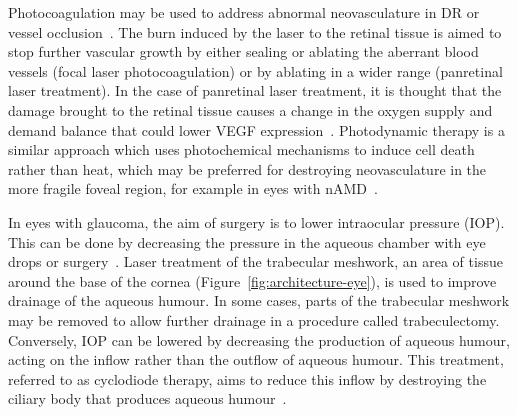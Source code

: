 \documentclass{article}
\begin{document}

Photocoagulation may be used to address abnormal neovasculature in DR or vessel occlusion~\cite{Evans_2014}.
The burn induced by the laser to the retinal tissue is aimed to stop further vascular growth by either sealing or ablating the aberrant blood vessels (focal laser photocoagulation) or by ablating in a wider range (panretinal laser treatment).
In the case of panretinal laser treatment, it is thought that the damage brought to the retinal tissue causes a change in the oxygen supply and demand balance that could lower VEGF expression~\cite{Evans_2014}.
Photodynamic therapy is a similar approach which uses photochemical mechanisms to induce cell death rather than heat, which may be preferred for destroying neovasculature in the more fragile foveal region, for example in eyes with nAMD~\cite{SchmidtErfurth_2000}.

In eyes with glaucoma, the aim of surgery is to lower intraocular pressure (IOP).
This can be done by decreasing the pressure in the aqueous chamber with eye drops or surgery~\cite{Quigley_2011}.
Laser treatment of the trabecular meshwork, an area of tissue around the base of the cornea (Figure~\ref{fig:architecture-eye}), is used to improve drainage of the aqueous humour.
In some cases, parts of the trabecular meshwork may be removed to allow further drainage in a procedure called trabeculectomy.
Conversely, IOP can be lowered by decreasing the production of aqueous humour, acting on the inflow rather than the outflow of aqueous humour.
This treatment, referred to as cyclodiode therapy, aims to reduce this inflow by destroying the ciliary body that produces aqueous humour~\cite{Allbon_2022}.
\end{document}
